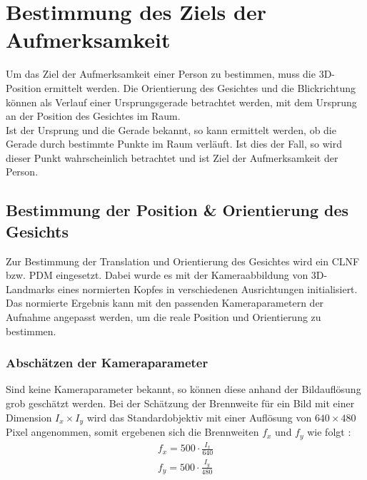 \section{Bestimmung des Ziels der Aufmerksamkeit}
\label{calc_Position}
Um das Ziel der Aufmerksamkeit einer Person zu bestimmen, muss die 3D-Position ermittelt werden. Die Orientierung des Gesichtes und die Blickrichtung können als Verlauf einer Ursprungsgerade betrachtet werden, mit dem Ursprung an der Position des Gesichtes im Raum.\\
Ist der Ursprung und die Gerade bekannt, so kann ermittelt werden, ob die Gerade durch bestimmte Punkte im Raum verläuft. Ist dies der Fall, so wird dieser Punkt wahrscheinlich betrachtet und ist Ziel der Aufmerksamkeit der Person.
\subsection{Bestimmung der Position \& Orientierung des Gesichts}
Zur Bestimmung der Translation und Orientierung des Gesichtes wird ein CLNF bzw. PDM eingesetzt. Dabei wurde es mit der Kameraabbildung von 3D-Landmarks eines normierten Kopfes in verschiedenen Ausrichtungen initialisiert. Das normierte Ergebnis kann mit den passenden Kameraparametern der Aufnahme angepasst werden, um die reale Position und Orientierung zu bestimmen.
\subsubsection{Abschätzen der Kameraparameter}
Sind keine Kameraparameter bekannt, so können diese anhand der Bildauflösung grob geschätzt werden. Bei der Schätzung der Brennweite für ein Bild mit einer Dimension $I_x\times I_y$ wird das Standardobjektiv mit einer Auflösung von $640 \times 480$ Pixel angenommen, somit ergebenen sich die Brennweiten $f_x$ und $f_y$ wie folgt \cite{OpenFace}:
\begin{align*}
f_x = 500\cdot \frac{I_x}{640}\\
f_y = 500\cdot \frac{I_y}{480}
\end{align*}
